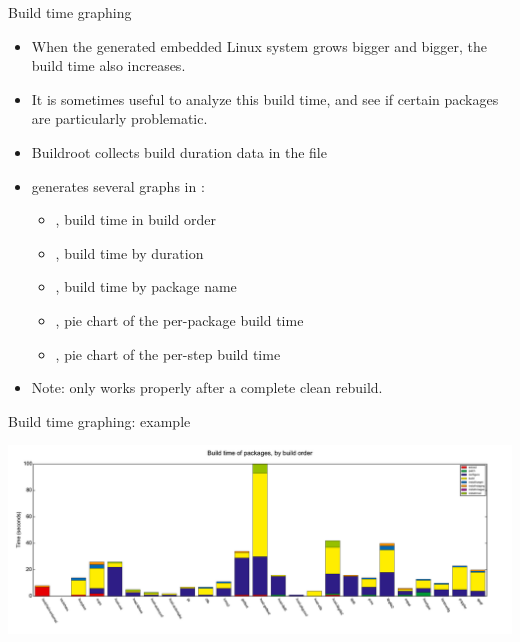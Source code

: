 \begin{frame}{Build time graphing}
  \begin{itemize}
  \item When the generated embedded Linux system grows bigger and
    bigger, the build time also increases.
  \item It is sometimes useful to analyze this build time, and see if
    certain packages are particularly problematic.
  \item Buildroot collects build duration data in the file
  \item {} generates several graphs in
    :
    \begin{itemize}
    \item {}, build time in build order
    \item {}, build time by duration
    \item {}, build time by package name
    \item {}, pie chart of the per-package
      build time
    \item {}, pie chart of the per-step build
      time
    \end{itemize}
  \item Note: only works properly after a complete clean rebuild.
  \end{itemize}
\end{frame}

\begin{frame}{Build time graphing: example}
  \begin{center}
    \includegraphics[width=\textwidth]{slides/buildroot-analysis/build-hist-build.pdf}
  \end{center}
\end{frame}

